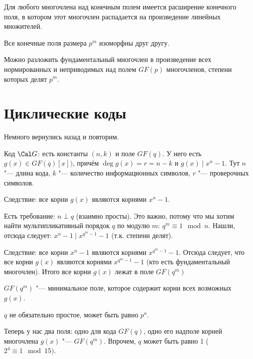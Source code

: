\begin{theorem}
	Для любого многочлена над конечным полем имеется расширение конечного поля,
	в котором этот многочлен распадается на произведение линейных множителей.
\end{theorem}

\begin{theorem}
	Все конечные поля размера $p^m$ изоморфны друг другу.
\end{theorem}

\begin{theorem}
	Можно разложить фундаментальный многочлен в произведение
	всех нормированных и неприводимых над полем $GF(p)$ многочленов,
	степени которых делят $p^m$.
\end{theorem}

\section{Циклические коды}
Немного вернулись назад и повторим.

Код $\Cal G$: есть константы $(n, k)$ и поле $GF(q)$.
У него есть $g(x) \in GF(q)[x])$,
причём $\deg g(x) = r = n - k$ и $g(x) \mid x^n - 1$.
Тут $n$ "--- длина кода, $k$ "--- количество информационных символов,
$r$ "--- проверочных символов.

Следствие: все корни $g(x)$ являются корнями $x^n-1$.

Есть требование: $n \perp q$ (взаимно просты).
Это важно, потому что мы хотим найти мультипликативный
порядок $q$ по модулю $m$: $q^m \equiv 1 \mod n$.
Нашли, отсюда следует: $x^n-1 \mid x^{q^m-1}-1$ (т.к. степени делят).

Следствие: все корни $x^n-1$ являются корнями $x^{q^m-1}-1$.
Отсюда следует, что все корни $g(x)$ являются корнями  $x^{q^m-1}-1$ (кто есть фундаментальный многочлен).
Итого все корни $g(x)$ лежат в поле $GF(q^m)$
\begin{lemma}
$GF(q^m)$ "--- минимальное поле, которое содержит корни всех возможных $g(x)$.
\end{lemma}
\begin{Rem}
$q$ не обязательно простое, может быть равно $p^a$.
\end{Rem}

\begin{Rem}
	Теперь у нас два поля: одно для кода $GF(q)$, одно его надполе
	корней многочлена $g(x)$ "--- $GF(q^m)$.
	Впрочем, $q$ может быть равно 1 ($2^4\equiv 1 \mod 15)$.
\end{Rem}

